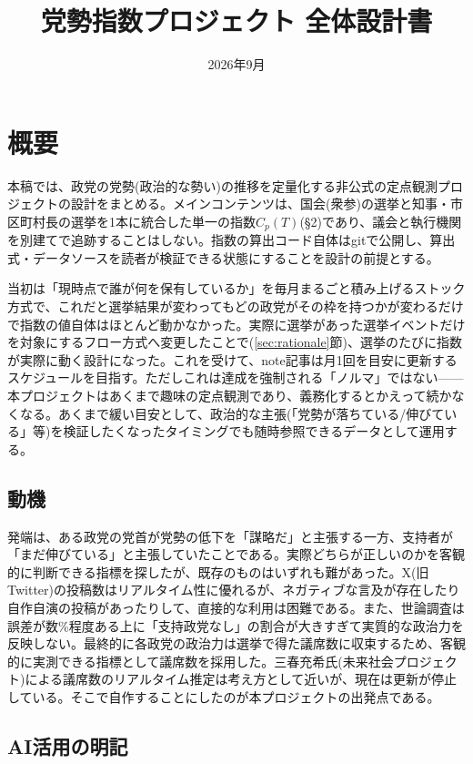 \documentclass[a4paper,11pt]{ltjsarticle}
\title{党勢指数プロジェクト 全体設計書}
\author{}
\date{2026年9月}
\begin{document}
\maketitle

\section{概要}

本稿では、政党の党勢(政治的な勢い)の推移を定量化する非公式の定点観測プロジェクトの設計をまとめる。メインコンテンツは、国会(衆参)の選挙と知事・市区町村長の選挙を1本に統合した単一の指数$C_p(T)$(\S2)であり、議会と執行機関を別建てで追跡することはしない。指数の算出コード自体はgitで公開し、算出式・データソースを読者が検証できる状態にすることを設計の前提とする。

当初は「現時点で誰が何を保有しているか」を毎月まるごと積み上げるストック方式で、これだと選挙結果が変わってもどの政党がその枠を持つかが変わるだけで指数の値自体はほとんど動かなかった。実際に選挙があった選挙イベントだけを対象にするフロー方式へ変更したことで(\ref{sec:rationale}節)、選挙のたびに指数が実際に動く設計になった。これを受けて、note記事は月1回を目安に更新するスケジュールを目指す。ただしこれは達成を強制される「ノルマ」ではない——本プロジェクトはあくまで趣味の定点観測であり、義務化するとかえって続かなくなる。あくまで緩い目安として、政治的な主張(「党勢が落ちている/伸びている」等)を検証したくなったタイミングでも随時参照できるデータとして運用する。

\subsection{動機}

発端は、ある政党の党首が党勢の低下を「謀略だ」と主張する一方、支持者が「まだ伸びている」と主張していたことである。実際どちらが正しいのかを客観的に判断できる指標を探したが、既存のものはいずれも難があった。X(旧Twitter)の投稿数はリアルタイム性に優れるが、ネガティブな言及が存在したり自作自演の投稿があったりして、直接的な利用は困難である。また、世論調査は誤差が数\%程度ある上に「支持政党なし」の割合が大きすぎて実質的な政治力を反映しない。最終的に各政党の政治力は選挙で得た議席数に収束するため、客観的に実測できる指標として議席数を採用した。三春充希氏(未来社会プロジェクト)による議席数のリアルタイム推定は考え方として近いが、現在は更新が停止している。そこで自作することにしたのが本プロジェクトの出発点である。

\subsection{AI活用の明記}
\end{document}
